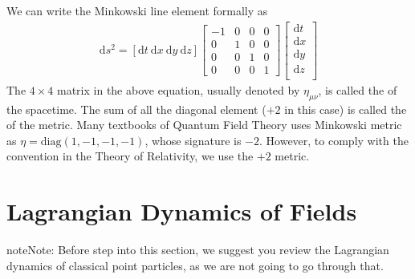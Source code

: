 \documentclass[letterpaper,10pt,english]{sphinxmanual}
\begin{document}
We can write the Minkowski line element formally as
\begin{equation*}
\begin{split}\mathrm d s^2 = [\mathrm d t\ \mathrm d x\ \mathrm d y\ \mathrm d z]
\left[
\begin{matrix}
-1 & 0 & 0 & 0\\
0 & 1 & 0 & 0\\
0 & 0 & 1 & 0\\
0 & 0 & 0 & 1
\end{matrix}
\right]
\left[
\begin{matrix}
\mathrm d t\\
\mathrm d x\\
\mathrm d y\\
\mathrm d z\\
\end{matrix}
\right]\end{split}
\end{equation*}
The \(4\times 4\) matrix in the above equation, usually denoted by \(\eta_{\mu\nu}\), is called the  of the spacetime. The sum of all the diagonal element (\(+2\) in this case) is called the  of the metric. Many textbooks of Quantum Field Theory uses Minkowski metric as \(\eta = \mathrm{diag}(1,-1,-1,-1)\), whose signature is \(-2\). However, to comply with the convention in the Theory of Relativity, we use the \(+2\) metric.


\section{Lagrangian Dynamics of Fields}
\label{\detokenize{bg_lag_dyn:lagrangian-dynamics-of-fields}}\label{\detokenize{bg_lag_dyn::doc}}
\begin{sphinxadmonition}{note}{Note:}
Before step into this section, we suggest you review the Lagrangian dynamics of classical point particles, as we are not going to go through that.
\end{sphinxadmonition}
\end{document}
